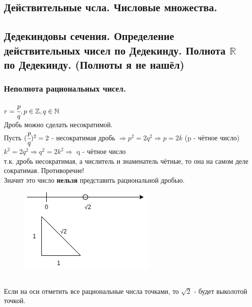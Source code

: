 \documentclass[12pt, a4paper]{article}
\newcommand{\N}{\mathbb{N}}
\newcommand{\Z}{\mathbb{Z}}
\newcommand{\R}{\mathbb{R}}
\begin{document}
\begin{centering}
\section{Действительные чсла. Числовые множества.}
\subsection{Дедекиндовы сечения. Определение действительных чисел по Дедекинду. Полнота $\R$ по Дедекинду. (Полноты я не нашёл)}

\subsubsection{Неполнота рациональных чисел.}
$r = \cfrac{p}{q},p\in \Z,q\in\N $\\
Дробь можно сделать несократимой.\\
Пусть $(\cfrac{p}{q})^2 = 2$ - несократимая дробь $\Rightarrow p^2 = 2q^2 \Rightarrow p = 2k$ (p - чётное число) \\
$k^2 = 2q^2 \Rightarrow q^2 = 2k^2 \Rightarrow $ q - чётное число
\\т.к. дробь несократимая, а числитель и знаменатель чётные, то она на самом деле сократимая. Противоречие! \\
Значит это число \textbf{нельзя} представить рациональной дробью.
\begin{figure}[h]
    \includegraphics[width=0.2\linewidth]{images/Дедекиндовы сечения/Начало дедекиндовых сечений.png}
\end{figure}\\
Если на оси отметить все рациональные числа точками, то $\sqrt{2}$ - будет выколотой точкой.

\end{centering}
\end{document}
